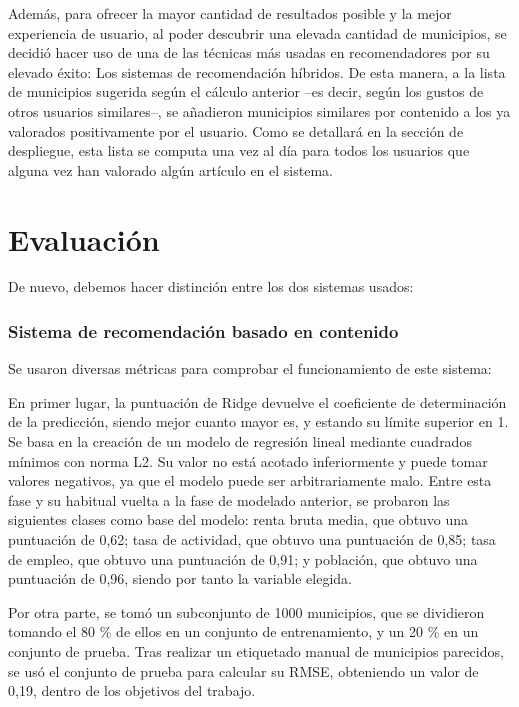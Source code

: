 Además, para ofrecer la mayor cantidad de resultados posible y la mejor experiencia de usuario, al poder descubrir una elevada cantidad de municipios, se decidió hacer uso de una de las técnicas más usadas en recomendadores por su elevado éxito: Los sistemas de recomendación híbridos. De esta manera, a la lista de municipios sugerida según el cálculo anterior –es decir, según los gustos de otros usuarios similares–, se añadieron municipios similares por contenido a los ya valorados positivamente por el usuario. Como se detallará en la sección de despliegue, esta lista se computa una vez al día para todos los usuarios que alguna vez han valorado algún artículo en el sistema.

\section{Evaluación}

De nuevo, debemos hacer distinción entre los dos sistemas usados:

\subsubsection{Sistema de recomendación basado en contenido}

Se usaron diversas métricas para comprobar el funcionamiento de este sistema:

En primer lugar, la puntuación de Ridge devuelve el coeficiente de determinación de la predicción, siendo mejor cuanto mayor es, y estando su límite superior en 1. Se basa en la creación de un modelo de regresión lineal mediante cuadrados mínimos con norma L2. Su valor no está acotado inferiormente y puede tomar valores negativos, ya que el modelo puede ser arbitrariamente malo. Entre esta fase y su habitual vuelta a la fase de modelado anterior, se probaron las siguientes clases como base del modelo: renta bruta media, que obtuvo una puntuación de 0,62; tasa de actividad, que obtuvo una puntuación de 0,85; tasa de empleo, que obtuvo una puntuación de 0,91; y población, que obtuvo una puntuación de 0,96, siendo por tanto la variable elegida.

Por otra parte, se tomó un subconjunto de 1000 municipios, que se dividieron tomando el 80 \% de ellos en un conjunto de entrenamiento, y un 20 \% en un conjunto de prueba. Tras realizar un etiquetado manual de municipios parecidos, se usó el conjunto de prueba para calcular su RMSE, obteniendo un valor de 0,19, dentro de los objetivos del trabajo.

